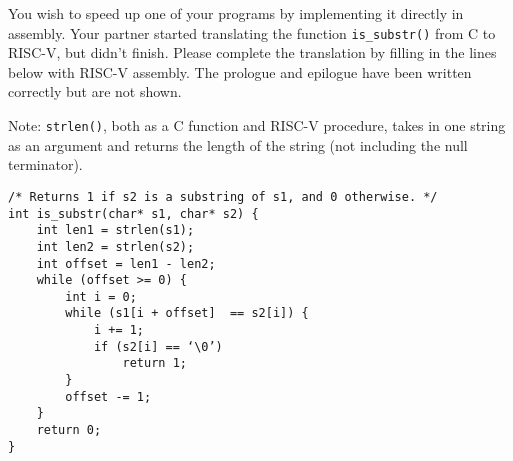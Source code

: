 \begin{blocksection}
\question
You wish to speed up one of your programs by implementing it directly in assembly. Your partner started translating the function \lstinline$is_substr()$ from C to RISC-V, but didn’t finish. Please complete the translation by filling in the lines below with RISC-V assembly. The prologue and epilogue have been written correctly but are not shown.

Note: \lstinline$strlen()$, both as a C function and RISC-V procedure, takes in one string as an argument and returns the length of the string (not including the null terminator).

\begin{verbatim}
/* Returns 1 if s2 is a substring of s1, and 0 otherwise. */
int is_substr(char* s1, char* s2) {
    int len1 = strlen(s1);
    int len2 = strlen(s2);
    int offset = len1 - len2;
    while (offset >= 0) {
        int i = 0;
        while (s1[i + offset]  == s2[i]) {
            i += 1;
            if (s2[i] == ‘\0’) 
                return 1;
        }
        offset -= 1;
    }
    return 0;
}
\end{verbatim}


\end{blocksection}